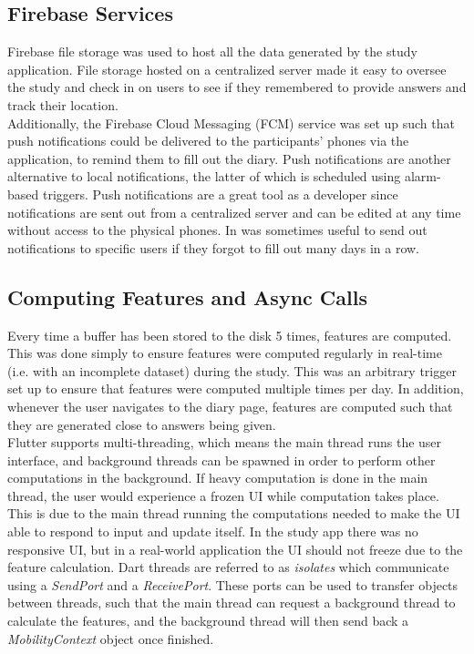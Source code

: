 \subsection{Firebase Services}
Firebase file storage was used to host all the data generated by the study application. File storage hosted on a centralized server made it easy to oversee the study and check in on users to see if they remembered to provide answers and track their location. \\

Additionally, the Firebase Cloud Messaging (FCM) service was set up such that push notifications could be delivered to the participants' phones via the application, to remind them to fill out the diary. Push notifications are another alternative to local notifications, the latter of which is scheduled using alarm-based triggers. Push notifications are a great tool as a developer since notifications are sent out from a centralized server and can be edited at any time without access to the physical phones. In was sometimes useful to send out notifications to specific users if they forgot to fill out many days in a row.

\subsection{Computing Features and Async Calls}
Every time a buffer has been stored to the disk 5 times, features are computed. This was done simply to ensure features were computed regularly in real-time (i.e. with an incomplete dataset) during the study. This was an arbitrary trigger set up to ensure that features were computed multiple times per day. In addition, whenever the user navigates to the diary page, features are computed such that they are generated close to answers being given.\\

Flutter supports multi-threading, which means the main thread runs the user interface, and background threads can be spawned in order to perform other computations in the background. If heavy computation is done in the main thread, the user would experience a frozen UI while computation takes place. This is due to the main thread running the computations needed to make the UI able to respond to input and update itself. In the study app there was no responsive UI, but in a real-world application the UI should not freeze due to the feature calculation. Dart threads are referred to as \textit{isolates} which communicate using a \textit{SendPort} and a \textit{ReceivePort}. These ports can be used to transfer objects between threads, such that the main thread can request a background thread to calculate the features, and the background thread will then send back a \textit{MobilityContext} object once finished. 

